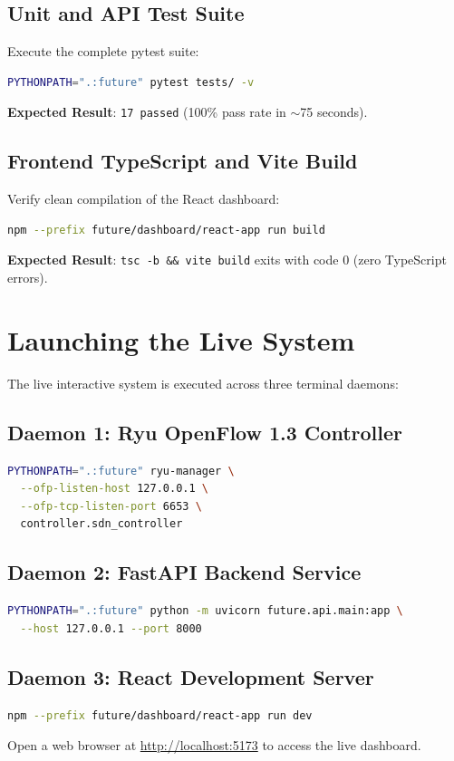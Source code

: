 \subsection{Unit and API Test Suite}
Execute the complete pytest suite:
\begin{lstlisting}[language=bash]
PYTHONPATH=".:future" pytest tests/ -v
\end{lstlisting}
\textbf{Expected Result}: \texttt{17 passed} (100\% pass rate in $\sim$75 seconds).

\subsection{Frontend TypeScript and Vite Build}
Verify clean compilation of the React dashboard:
\begin{lstlisting}[language=bash]
npm --prefix future/dashboard/react-app run build
\end{lstlisting}
\textbf{Expected Result}: \texttt{tsc -b \&\& vite build} exits with code 0 (zero TypeScript errors).

\section{Launching the Live System}
The live interactive system is executed across three terminal daemons:

\subsection{Daemon 1: Ryu OpenFlow 1.3 Controller}
\begin{lstlisting}[language=bash]
PYTHONPATH=".:future" ryu-manager \
  --ofp-listen-host 127.0.0.1 \
  --ofp-tcp-listen-port 6653 \
  controller.sdn_controller
\end{lstlisting}

\subsection{Daemon 2: FastAPI Backend Service}
\begin{lstlisting}[language=bash]
PYTHONPATH=".:future" python -m uvicorn future.api.main:app \
  --host 127.0.0.1 --port 8000
\end{lstlisting}

\subsection{Daemon 3: React Development Server}
\begin{lstlisting}[language=bash]
npm --prefix future/dashboard/react-app run dev
\end{lstlisting}
Open a web browser at \url{http://localhost:5173} to access the live dashboard.

